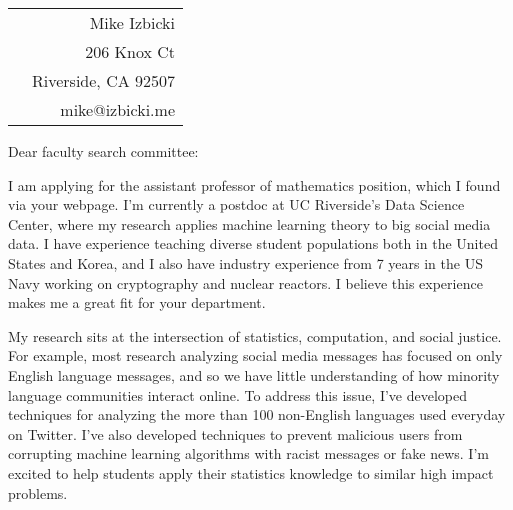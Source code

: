 \documentclass[12pt]{article}
\begin{document}
\noindent
\hspace{-0.13in}
\begin{tabularx}{1.03\textwidth}{Xr}
 & Mike Izbicki \\
 & 206 Knox Ct\\
 & Riverside, CA 92507\\
 & mike@izbicki.me\\
\end{tabularx}

\vspace{0.2in}

\setlength{\parskip}{15pt plus4mm minus3mm}

\noindent
Dear faculty search committee:

\noindent
I am applying for the assistant professor of mathematics position, which I found via your webpage.
I'm currently a postdoc at UC Riverside's Data Science Center,
where my research applies machine learning theory to big social media data.
I have experience teaching diverse student populations both in the United States and Korea,
and I also have industry experience from 7 years in the US Navy working on cryptography and nuclear reactors.
I believe this experience makes me a great fit for your department.

\noindent
My research sits at the intersection of statistics, computation, and social justice.
For example, most research analyzing social media messages has focused on only English language messages,
and so we have little understanding of how minority language communities interact online.
To address this issue, I've developed techniques for analyzing the more than 100 non-English languages used everyday on Twitter.
I've also developed techniques to prevent malicious users from corrupting machine learning algorithms with racist messages or fake news.
I'm excited to help students apply their statistics knowledge to similar high impact problems.
\end{document}
